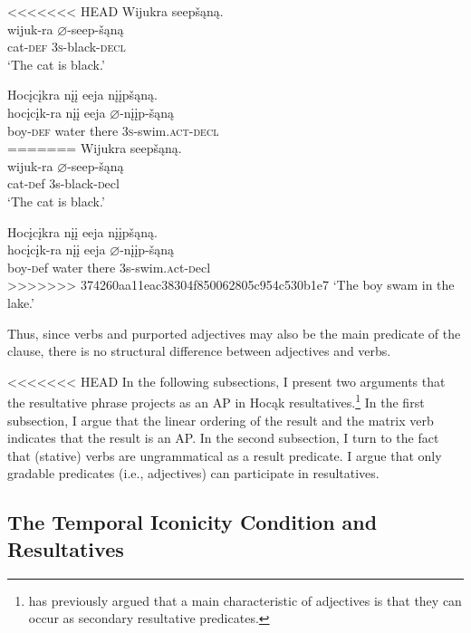 \documentclass[output=paper]{LSP/langsci}
\begin{document}
\begin{exe}
\begin{exe}
\begin{exe}
\begin{exe}
{\begin{exe}
\begin{exe}
\ex
\begin{xlist}

<<<<<<< HEAD
\ex \glll Wijukra seepšąną. \\
wijuk-ra {$\varnothing$}-seep-šąną\\
cat-\textsc{def} \textsc{3s}-black-\textsc{decl}\\
\glt `The cat is black.'


\ex \glll Hocįcįkra nįį eeja nįįpšąną.\\
hocįcįk-ra nįį eeja {$\varnothing$}-nįįp-šąną\\
boy-\textsc{def} water there \textsc{3s}-swim.\textsc{act}-\textsc{decl}\\
=======
\ex \glll Wijukra seep\v{s}\k{a}n\k{a}. \\
wijuk-ra $\varnothing$-seep-\v{s}\k{a}n\k{a}\\
cat-{\textsc def} {\textsc 3s}-black-{\textsc decl}\\
\glt `The cat is black.'


\ex \glll Hoc\k{i}c\k{i}kra n\k{i}\k{i} eeja n\k{i}\k{i}p\v{s}\k{a}n\k{a}.\\
hoc\k{i}c\k{i}k-ra n\k{i}\k{i} eeja $\varnothing$-n\k{i}\k{i}p-\v{s}\k{a}n\k{a}\\
boy-{\textsc def} water there {\textsc 3s}-swim.{\textsc act}-{\textsc decl}\\
>>>>>>> 374260aa11eac38304f850062805c954c530b1e7
\glt `The boy swam in the lake.'

\end{xlist}
\end{exe}


Thus, since verbs and purported adjectives may also be the main predicate of the clause, there is no structural difference between adjectives and verbs.

<<<<<<< HEAD
In the following subsections, I present two arguments that the resultative phrase projects as an AP in Hocąk resultatives.\footnote{\citet{Baker2003} has previously argued that a main characteristic of adjectives is that they can occur as secondary resultative predicates.} In the first subsection, I argue that the linear ordering of the result and the matrix verb indicates that the result is an AP. In the second subsection, I turn to the fact that (stative) verbs are ungrammatical as a result predicate. I argue that only gradable predicates (i.e., adjectives) can participate in resultatives. 

\subsection{The Temporal Iconicity Condition and Resultatives}


\end{exe}}
\end{exe}
\end{exe}
\end{exe}
\end{exe}
\end{document}
